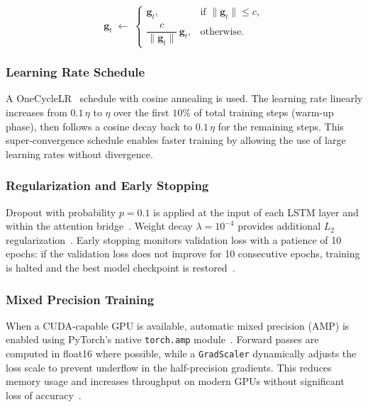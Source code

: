 \documentclass[12pt,a4paper]{report}
\begin{document}
\begin{equation}
  \mathbf{g}_t \;\leftarrow\;
  \begin{cases}
    \mathbf{g}_t, & \text{if } \|\mathbf{g}_t\| \le c, \\[4pt]
    \dfrac{c}{\|\mathbf{g}_t\|}\,\mathbf{g}_t, & \text{otherwise}.
  \end{cases}
  \label{eq:grad_clip}
\end{equation}

\subsubsection{Learning Rate Schedule}

A OneCycleLR~\cite{smith2019} schedule with cosine annealing is used.  The learning rate linearly increases from $0.1\,\eta$ to $\eta$ over the first $10\%$ of total training steps (warm-up phase), then follows a cosine decay back to $0.1\,\eta$ for the remaining steps.  This super-convergence schedule enables faster training by allowing the use of large learning rates without divergence.

\subsubsection{Regularization and Early Stopping}

Dropout with probability $p = 0.1$ is applied at the input of each LSTM layer and within the attention bridge~\cite{srivastava2014}.  Weight decay $\lambda = 10^{-4}$ provides additional $L_2$ regularization~\cite{loshchilov2019}.  Early stopping monitors validation loss with a patience of 10 epochs: if the validation loss does not improve for 10 consecutive epochs, training is halted and the best model checkpoint is restored~\cite{prechelt1998}.

\subsubsection{Mixed Precision Training}

When a CUDA-capable GPU is available, automatic mixed precision (AMP) is enabled using PyTorch's native \texttt{torch.amp} module~\cite{paszke2019,micikevicius2018}.  Forward passes are computed in float16 where possible, while a \texttt{GradScaler} dynamically adjusts the loss scale to prevent underflow in the half-precision gradients.  This reduces memory usage and increases throughput on modern GPUs without significant loss of accuracy~\cite{micikevicius2018}.
\end{document}
